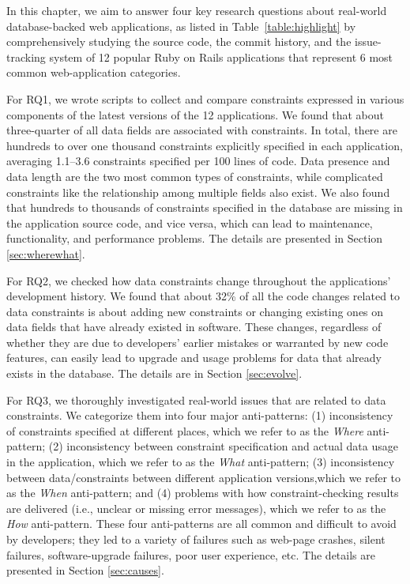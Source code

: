 In this chapter, we aim to answer four key research questions about real-world database-backed
web applications, as listed in Table~\ref{table:highlight} by comprehensively
studying the source code, the commit history, and the issue-tracking system of 12 popular Ruby on Rails applications that represent 6 most common web-application categories. 

{For RQ1}, we wrote scripts to collect and compare constraints expressed in various components of the latest versions of the 12 applications. We found that about three-quarter of all data fields are associated with constraints. In total, there are hundreds to over 
one thousand constraints explicitly specified in 
each application, averaging 1.1--3.6 constraints
specified per 100 lines of code. Data presence and data length are the two most common types of constraints,
while complicated constraints like the relationship among multiple fields also exist. 
We also found
that hundreds to thousands of constraints specified in the
database are missing in the application source code, and vice versa, 
which can lead to maintenance, functionality,
and performance problems.
The details are presented in Section \ref{sec:wherewhat}.


{For RQ2}, we checked how data constraints change throughout the applications' development history. 
We found that about 32\% of all the code changes related to data constraints is about adding new constraints or changing existing ones on data fields that have already existed in software. These changes, regardless of whether they are due to developers' earlier mistakes or warranted by new code features, can easily lead to upgrade and usage problems for data that already exists in the database.
The details are in Section \ref{sec:evolve}.
 
{For RQ3}, we thoroughly investigated \numissues real-world issues that are related to data constraints. We categorize them into four major anti-patterns:
(1) inconsistency of constraints specified at different places, which we refer to as the {\it Where} anti-pattern;
(2) inconsistency between constraint specification and actual data usage in the application, which we refer to as the {\it What} anti-pattern;
(3) inconsistency between data/constraints between different application versions,which we refer to as the {\it When} anti-pattern;
and (4) problems with how constraint-checking results are
delivered (i.e., unclear or missing error messages), which
we refer to as the {\it How} anti-pattern. These four anti-patterns are all common and difficult to avoid by developers; they led to a variety of failures such as web-page crashes, silent failures, software-upgrade failures, poor user experience, etc.   
The details are presented in Section \ref{sec:causes}.

